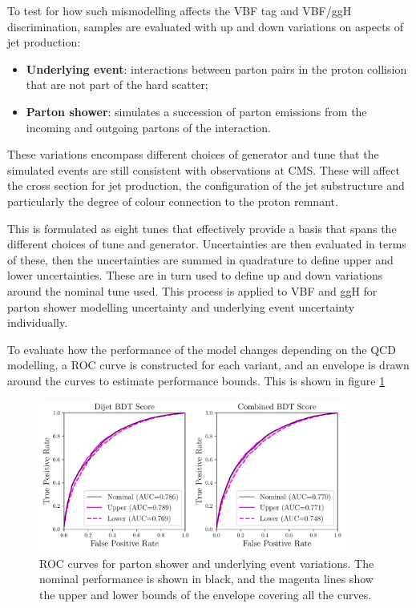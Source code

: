 To test for how such mismodelling affects the VBF tag and VBF/ggH discrimination, samples are evaluated with up and down variations on aspects of jet production:
\begin{itemize}[noitemsep]
    \item \textbf{Underlying event}: interactions between parton pairs in the proton collision that are not part of the hard scatter;
    \item \textbf{Parton shower}: simulates a succession of parton emissions from the incoming and outgoing partons of the interaction.
\end{itemize}
These variations encompass different choices of generator and tune that the simulated events are still consistent with observations at CMS. 
These will affect the cross section for jet production, the configuration of the jet substructure and particularly the degree of colour connection to the proton remnant.

This is formulated as eight tunes that effectively provide a basis that spans the different choices of tune and generator. 
Uncertainties are then evaluated in terms of these, then the uncertainties are summed in quadrature to define upper and lower uncertainties. 
These are in turn used to define up and down variations around the nominal tune used. 
This process is applied to VBF and ggH for parton shower modelling uncertainty and underlying event uncertainty individually. 

To evaluate how the performance of the model changes depending on the QCD modelling, a ROC curve is constructed for each variant, and an envelope is drawn around the curves to estimate performance bounds. This is shown in figure \ref{fig:event_categorisation:ps_variant_validation}
\begin{figure}[h!]
    \begin{center}
        \includegraphics[width=0.9\textwidth]{figures/event_selection/psvar_ROCs_PS.pdf}
    \end{center}
    \caption{ROC curves for parton shower and underlying event variations. The nominal performance is shown in black, 
             and the magenta lines show the upper and lower bounds of the envelope covering all the curves.}
    \label{fig:event_categorisation:ps_variant_validation}
\end{figure}

